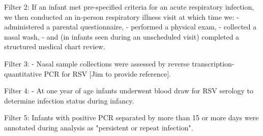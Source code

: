 Filter 2:
If an infant met pre-specified criteria for an acute respiratory infection, 
we then conducted an in-person respiratory illness visit at which time we:
	- administered a parental questionnaire, 
	- performed a physical exam, 
	- collected a nasal wash, 
	- and (in infants seen during an unscheduled visit) completed a structured medical chart review.

Filter 3: 
	- Nasal sample collections were assessed by reverse transcription-quantitative PCR for RSV [Jim to provide reference].

Filter 4:
	- At one year of age infants underwent blood draw for RSV serology to determine infection status during infancy. 

Filter 5:
Infants with positive PCR separated by more than 15 or more days were annotated during analysis as "persistent or repeat infection".